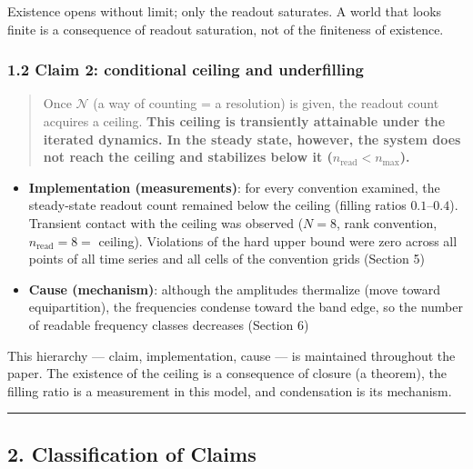 \documentclass[
  a4paper,
]{article}
\providecommand{\tightlist}{%
  \setlength{\itemsep}{0pt}\setlength{\parskip}{0pt}}
\begin{document}
Existence opens without limit; only the readout saturates. A world that
looks finite is a consequence of readout saturation, not of the
finiteness of existence.

\subsubsection{1.2 Claim 2: conditional ceiling and
underfilling}\label{claim-2-conditional-ceiling-and-underfilling}

\begin{quote}
Once \(\mathcal N\) (a way of counting = a resolution) is given, the
readout count acquires a ceiling. \textbf{This ceiling is transiently
attainable under the iterated dynamics. In the steady state, however,
the system does not reach the ceiling and stabilizes below it
(\(n_{\mathrm{read}}<n_{\max}\)).}
\end{quote}

\begin{itemize}
\tightlist
\item
  \textbf{Implementation (measurements)}: for every convention examined,
  the steady-state readout count remained below the ceiling (filling
  ratios \(0.1\)--\(0.4\)). Transient contact with the ceiling was
  observed (\(N=8\), rank convention, \(n_{\mathrm{read}}=8=\) ceiling).
  Violations of the hard upper bound were zero across all points of all
  time series and all cells of the convention grids (Section 5)
\item
  \textbf{Cause (mechanism)}: although the amplitudes thermalize (move
  toward equipartition), the frequencies condense toward the band edge,
  so the number of readable frequency classes decreases (Section 6)
\end{itemize}

This hierarchy --- claim, implementation, cause --- is maintained
throughout the paper. The existence of the ceiling is a consequence of
closure (a theorem), the filling ratio is a measurement in this model,
and condensation is its mechanism.

\begin{center}\rule{0.5\linewidth}{0.5pt}\end{center}

\subsection{2. Classification of Claims}\label{classification-of-claims}
\end{document}

